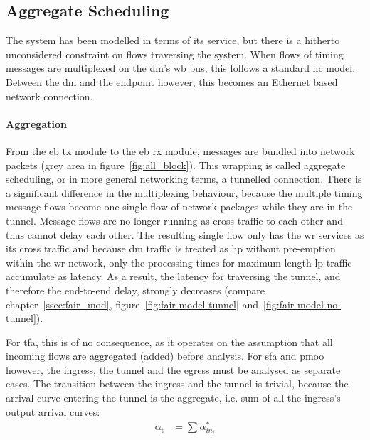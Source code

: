 \subsection{Aggregate Scheduling}
\label{ssec:tunnel}
The system has been modelled in terms of its service, but there is a hitherto unconsidered constraint on flows traversing the system. When flows of timing messages are multiplexed on the \gls{dm}'s \gls{wb} bus,
this follows a standard \gls{nc} model. Between the \gls{dm} and the endpoint however, this becomes an Ethernet based network connection. 
\paragraph{Aggregation}
From the \gls{eb} \gls{tx} module to the \gls{eb} \gls{rx} module, messages are bundled into network packets (grey area in figure~\ref{fig:all_block}).
This wrapping is called aggregate scheduling, or in more general networking terms, a tunnelled connection. There is a significant difference in the multiplexing behaviour, because the multiple timing message flows become
one single flow of network packages while they are in the tunnel. Message flows are no longer running as cross traffic to each other and thus cannot delay each other.
The resulting single flow only has the \gls{wr} services as its cross traffic and because \gls{dm} traffic is treated as \gls{hp} without pre-emption within the \gls{wr} network, only the processing times for maximum length \gls{lp} traffic accumulate as latency.
As a result, the latency for traversing the tunnel, and therefore the end-to-end delay, strongly decreases (compare chapter~\ref{ssec:fair_mod}, figure~\ref{fig:fair-model-tunnel} and~\ref{fig:fair-model-no-tunnel}).
\par
For \gls{tfa}, this is of no consequence, as it operates on the assumption that all incoming flows are aggregated (added) before analysis.
For \gls{sfa} and \gls{pmoo} however, the ingress, the tunnel and the egress must be analysed as separate cases.
The transition between the ingress and the tunnel is trivial, because the arrival curve entering the tunnel is the aggregate, i.e. sum of all the ingress's output arrival curves:
%
\begin{align}
\mathrm{\alpha_t} &=  \sum \alpha^*_{{in}_i}
\label{eq:in_tu}
\end{align}
%
